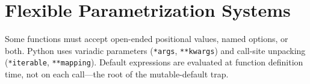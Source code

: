 \section{Flexible Parametrization Systems}

Some functions must accept open-ended positional values, named options, or both. Python uses variadic parameters (\texttt{*args}, \texttt{**kwargs}) and call-site unpacking (\texttt{*iterable}, \texttt{**mapping}). Default expressions are evaluated at function definition time, not on each call---the root of the mutable-default trap.
